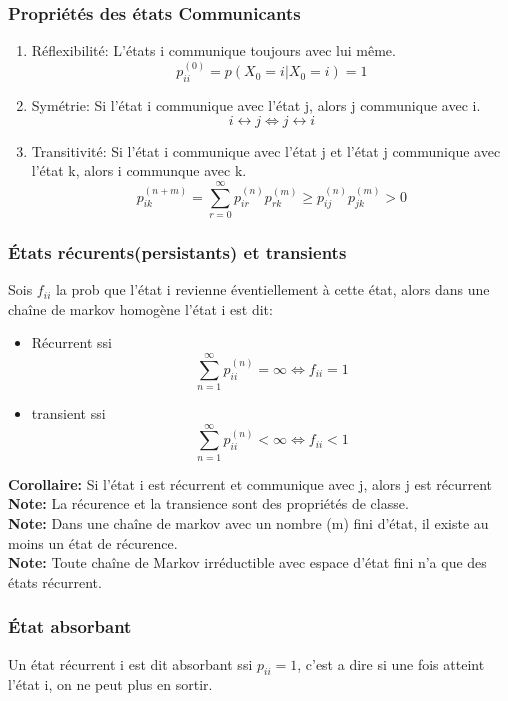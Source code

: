\documentclass[13pt]{article}
\begin{document}
\subsubsection*{Propriétés des états Communicants}
\begin{enumerate}
  \item Réflexibilité: L'états i communique toujours avec lui même.
  \[ p_{ii}^{(0)} = p(X_0 = i|X_0 = i) = 1 \]
  \item Symétrie: Si l'état i communique avec l'état j, alors j communique avec i.
  \[ i \leftrightarrow j \Leftrightarrow j \leftrightarrow i \]
  \item Transitivité: Si l'état i communique avec l'état j et l'état j communique avec l'état k, alors i communque avec k.
  \[ p_{ik}^{(n+m)} = \sum_{r=0}^\infty p_{ir}^{(n)} p_{rk}^{(m)} \geq p_{ij}^{(n)} p_{jk}^{(m)} > 0\]
\end{enumerate}

\subsubsection*{États récurents(persistants) et transients}
Sois $f_{ii}$ la prob que l'état i revienne éventiellement à cette état, alors 
dans une chaîne de markov homogène l'état i est dit:
\begin{itemize}
  \item Récurrent ssi
  \[ \sum_{n=1}^\infty p_{ii}^{(n)} = \infty \Leftrightarrow f_{ii} = 1 \]
  \item transient ssi
  \[ \sum_{n=1}^\infty p_{ii}^{(n)} < \infty \Leftrightarrow f_{ii} < 1 \]
\end{itemize}
\textbf{Corollaire:} Si l'état i est récurrent et communique avec j, alors j est récurrent \\
\textbf{Note:} La récurence et la transience sont des propriétés de classe. \\ 
\textbf{Note:} Dans une chaîne de markov avec un nombre (m) fini d'état, il existe au moins un état de récurence. \\
\textbf{Note:} Toute chaîne de Markov irréductible avec espace d'état fini n'a que des états récurrent.


\subsubsection*{État absorbant}
Un état récurrent i est dit absorbant ssi $p_{ii} = 1$, c'est a dire si une fois atteint l'état i, on ne peut plus en sortir.
\end{document}
